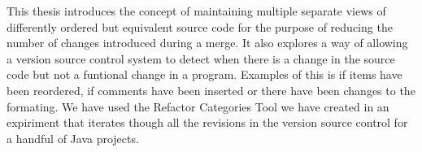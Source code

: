 This thesis introduces the concept of maintaining multiple separate views of differently ordered but equivalent source code for the purpose of reducing the number of changes introduced during a merge. 
It also explores a way of allowing a version source control system to detect when there is a change in the source code but not a funtional change in a program.  Examples of this is if items have been reordered, if comments have been inserted or there have been changes to the formating.  We have used the Refactor Categories Tool we have created in an expiriment that iterates though all the revisions in the version source control for a handful of Java projects.

% 

